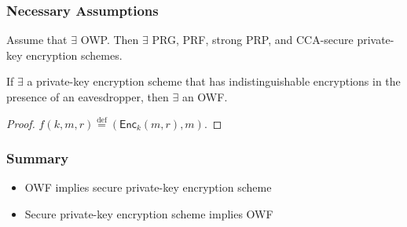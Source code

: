 %
\begin{frame}\frametitle{Necessary Assumptions}
\begin{theorem}
Assume that $\exists$ OWP. Then $\exists$ PRG, PRF, strong PRP, and CCA-secure private-key encryption schemes.
\end{theorem}
\begin{proposition}
If $\exists$ a private-key encryption scheme that has indistinguishable encryptions in the presence of an eavesdropper, then $\exists$ an OWF.
\end{proposition}
\begin{proof}
$f(k,m,r) \overset{\text{def}}{=} (\mathsf{Enc}_k(m,r),m)$.
\end{proof}
\end{frame}
\begin{frame}\frametitle{Summary}
\begin{itemize}
\item OWF implies secure private-key encryption scheme
\item Secure private-key encryption scheme implies OWF
\end{itemize}
\end{frame}
